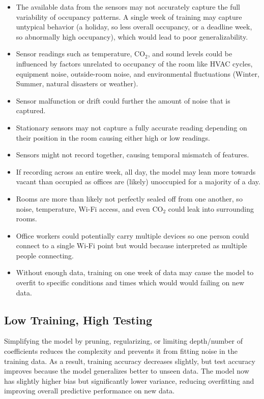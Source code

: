 \documentclass[12pt]{article}
\begin{document}
\begin{itemize}
    \item The available data from the sensors may not accurately capture the full variability of occupancy patterns. A single week of training may capture untypical behavior (a holiday,
    so less overall occupancy, or a deadline week, so abnormally high occupancy), which would lead to poor generalizability.
    \item Sensor readings such as temperature, CO$_2$, and sound levels could be influenced by factors unrelated to occupancy of the room
    like HVAC cycles, equipment noise, outside-room noise, and environmental fluctuations (Winter, Summer, natural disasters or weather).
    \item Sensor malfunction or drift could further the amount of noise that is captured.
    \item Stationary sensors may not capture a fully accurate reading depending on their position in the room causing either high or low readings.
    \item Sensors might not record together, causing temporal mismatch of features.
    \item If recording across an entire week, all day, the model may lean more towards vacant than occupied as offices are (likely)
    unoccupied for a majority of a day. 
    \item Rooms are more than likely not perfectly sealed off from one another, so noise, temperature, Wi-Fi access, and even CO$_2$ could
    leak into surrounding rooms.
    \item Office workers could potentially carry multiple devices so one person could connect to a single Wi-Fi point but would because
    interpreted as multiple people connecting.
    \item Without enough data, training on one week of data may cause the model to overfit to specific conditions and times which would
    would failing on new data.
\end{itemize}

\subsection{Low Training, High Testing}

Simplifying the model by pruning, regularizing, or limiting depth/number of coefficients reduces the complexity and prevents it from fitting
noise in the training data. As a result, training accuracy decreases slightly, but test accuracy improves because the model
generalizes better to unseen data. The model now has slightly higher bias but significantly lower variance, reducing overfitting and
improving overall predictive performance on new data.
\end{document}
